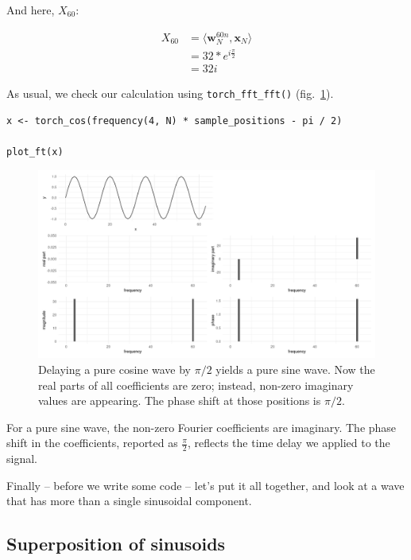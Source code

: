 \documentclass[
  letterpaper,
]{krantz}
\begin{document}
And here, \(X_{60}\):

\[
\begin{aligned}
X_{60} &= \langle \mathbf{w}^{60n}_N, \mathbf{x}_N \rangle \\
&= 32 *e^{i \frac{\pi}{2}} \\
&= 32i
\end{aligned}
\]

As usual, we check our calculation using \texttt{torch\_fft\_fft()}
(fig.~\ref{fig-dft-cos-phase-pi12}).

\begin{verbatim}
x <- torch_cos(frequency(4, N) * sample_positions - pi / 2)

plot_ft(x)
\end{verbatim}

\begin{figure}[H]

{\centering \includegraphics{images/dft-cos-phase-pi12.png}

}

\caption{\label{fig-dft-cos-phase-pi12}Delaying a pure cosine wave by
\(\pi/2\) yields a pure sine wave. Now the real parts of all
coefficients are zero; instead, non-zero imaginary values are appearing.
The phase shift at those positions is \(\pi/2\).}

\end{figure}

For a pure sine wave, the non-zero Fourier coefficients are imaginary.
The phase shift in the coefficients, reported as \(\frac{\pi}{2}\),
reflects the time delay we applied to the signal.

Finally -- before we write some code -- let's put it all together, and
look at a wave that has more than a single sinusoidal component.

\hypertarget{superposition-of-sinusoids}{%
\subsection{\texorpdfstring{Superposition of
sinusoids}{Superposition of sinusoids}}\label{superposition-of-sinusoids}}
\end{document}

